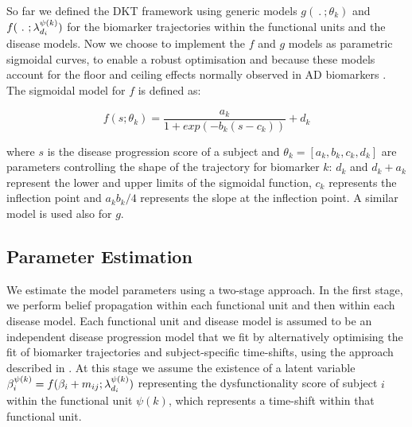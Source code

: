 So far we defined the DKT framework using generic models $g(\ .\ ; \theta_k)$ and $f(\ .\ ; \lambda_{d_i}^{\psi(k)})$ for the biomarker trajectories within the functional units and the disease models. Now we choose to implement the $f$ and $g$ models as parametric sigmoidal curves, to enable a robust optimisation and because these models account for the floor and ceiling effects normally observed in AD biomarkers \cite{sabuncu2011dynamics,caroli2010dynamics}. The sigmoidal model for $f$ is defined as:

\begin{equation}
 f(s;\theta_k) = \frac{a_k}{1+exp(-b_k(s-c_k))} + d_k
\end{equation}

where $s$ is the disease progression score of a subject and $\theta_k = [a_k, b_k, c_k, d_k]$ are parameters controlling the shape of the trajectory for biomarker $k$: $d_k$ and $d_k + a_k$ represent the lower and upper limits of the sigmoidal function, $c_k$ represents the inflection point and $a_k b_k/4$ represents the slope at the inflection point. A similar model is used also for $g$. 

\subsection{Parameter Estimation}

\newcommand{\uu}{^{(u)}}
\newcommand{\um}{^{(u-1)}}


We estimate the model parameters using a two-stage approach. In the first stage, we perform belief propagation within each functional unit and then within each disease model. Each functional unit and disease model is assumed to be an independent disease progression model that we fit by alternatively optimising the fit of biomarker trajectories and subject-specific time-shifts, using the approach described in \cite{jedynak2012computational}. At this stage we assume the existence of a latent variable $\beta_i^{\psi(k)} = f(\beta_i + m_{ij}; \lambda_{d_i}^{\psi(k)})$ representing the dysfunctionality score of subject $i$ within the functional unit $\psi(k)$, which represents a time-shift within that functional unit.

